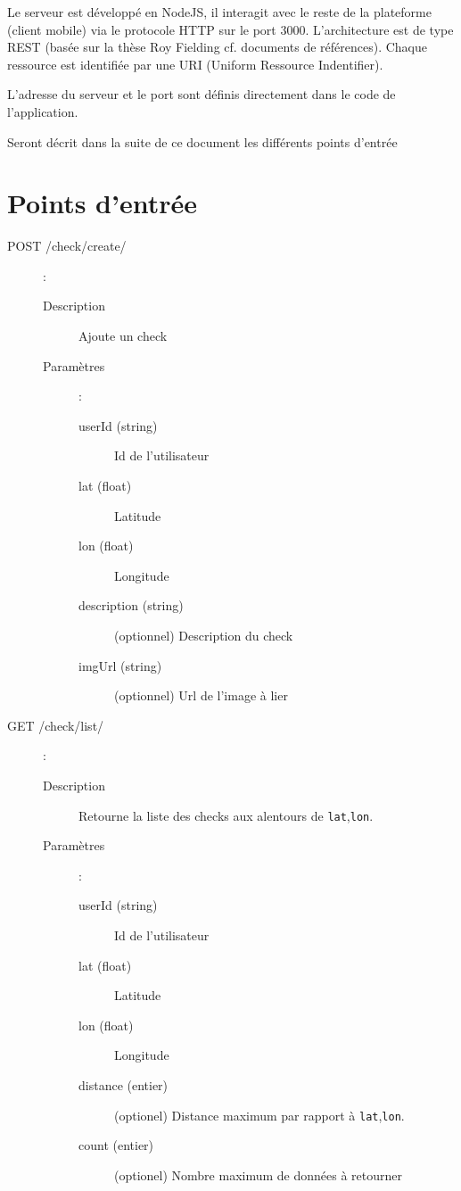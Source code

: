 \documentclass[a4paper,12pt]{report}
\begin{document}
\begin{onehalfspace}
Le serveur est développé en NodeJS, il interagit avec le reste de la plateforme (client mobile) via le protocole HTTP sur le port 3000. L'architecture est de type REST (basée sur la thèse Roy Fielding cf. documents de références). Chaque ressource est identifiée par une URI (Uniform Ressource Indentifier).

L'adresse du serveur et le port sont définis directement dans le code de l'application.

Seront décrit dans la suite de ce document les différents points d'entrée

\section{Points d'entrée}
\begin{description}
  \item[POST /check/create/]:

    \begin{description}
      \item[Description] Ajoute un check
      \item[Paramètres]:

        \begin{description}
          \item[userId (string)] Id de l'utilisateur
          \item[lat (float)] Latitude
          \item[lon (float)] Longitude
          \item[description (string)] (optionnel) Description du check
          \item[imgUrl (string)] (optionnel) Url de l'image à lier
        \end{description}
    \end{description}

  \item[GET /check/list/]:

    \begin{description}
      \item[Description] Retourne la liste des checks aux alentours de \lstinline{lat},\lstinline{lon}.

      \item[Paramètres]:
        \begin{description}
          \item[userId (string)] Id de l'utilisateur
          \item[lat (float)] Latitude
          \item[lon (float)] Longitude
          \item[distance (entier)] (optionel) Distance maximum par rapport à \lstinline{lat},\lstinline{lon}.
          \item[count (entier)] (optionel) Nombre maximum de données à retourner
        \end{description}
    \end{description}


\end{description}
\end{onehalfspace}
\end{document}
